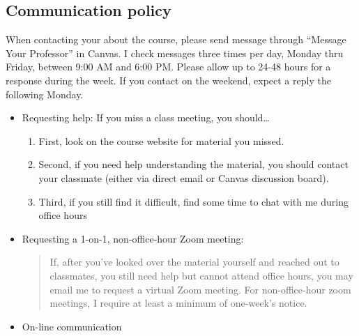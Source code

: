 \documentclass[11pt,]{article}
\providecommand{\tightlist}{%
  \setlength{\itemsep}{0pt}\setlength{\parskip}{0pt}}
\begin{document}
\hypertarget{communication-policy}{%
\subsection{Communication policy}\label{communication-policy}}

When contacting your about the course, please send message through
``Message Your Professor'' in Canvas. I check messages three times per
day, Monday thru Friday, between 9:00 AM and 6:00 PM. Please allow up to
24-48 hours for a response during the week. If you contact on the
weekend, expect a reply the following Monday.

\begin{itemize}
\item
  Requesting help: If you miss a class meeting, you should\ldots{}

  \begin{enumerate}
  \def\labelenumi{\arabic{enumi}.}
  \tightlist
  \item
    First, look on the course website for material you missed.
  \item
    Second, if you need help understanding the material, you should
    contact your classmate (either via direct email or Canvas discussion
    board).
  \item
    Third, if you still find it difficult, find some time to chat with
    me during office hours
  \end{enumerate}
\item
  Requesting a 1-on-1, non-office-hour Zoom meeting:

  \begin{quote}
  If, after you've looked over the material yourself and reached out to
  classmates, you still need help but cannot attend office hours, you
  may email me to request a virtual Zoom meeting. For non-office-hour
  zoom meetings, I require at least a minimum of one-week's notice.
  \end{quote}
\item
  On-line communication


\end{itemize}
\end{document}
